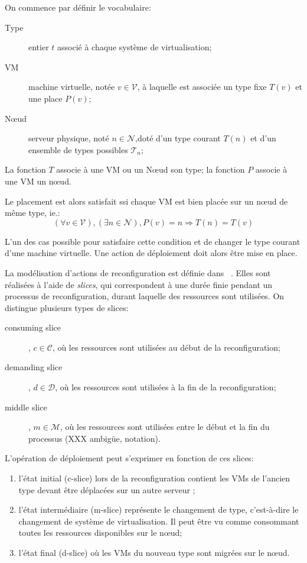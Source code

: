 On commence par définir le vocabulaire:
\begin{description}
	\item[Type] entier $t$ associé à chaque système de virtualisation;
	\item[VM] machine virtuelle, notée $v \in \mathcal V$, à laquelle
		est associée un type fixe $T(v)$ et une place $P(v)$;
	\item[Nœud] serveur physique, noté $n \in \mathcal N$,doté d'un
		type courant $T(n)$ et d'un ensemble de types possibles
		$\mathcal{T}_n$;
\end{description}


La fonction $T$ associe à une VM ou un Nœud son type; la fonction $P$
associe à une VM un nœud.

Le placement est alors satisfait ssi chaque VM est bien placée sur
un nœud de même type, ie.:
\[
	(\forall v \in \mathcal V), (\exists n \in \mathcal N), P(v) = n
		\Rightarrow T(n) = T(v)	
\]

L'un des cas possible pour satisfaire cette condition et de changer le
type courant d'une machine virtuelle. Une action de déploiement doit
alors être mise en place.

La modélisation d'actions de reconfiguration est définie dans ~\cite{herm2012}.
Elles sont réalisées à l'aide de \textit{slices}, qui correspondent à
une durée finie pendant un processus de reconfiguration, durant laquelle
des ressources sont utilisées.
On distingue plusieurs types de slices:
\begin{description}
	\item[consuming slice], $c \in \mathcal C$, où les ressources sont
		utilisées au début de la reconfiguration;
	\item[demanding slice], $d \in \mathcal D$, où les ressources sont
		utilisées à la fin de la reconfiguration;
	\item[middle slice], $m \in \mathcal M$, où les ressources sont utilisées
		entre le début et la fin du processus (XXX ambigüe, notation).
\end{description}

L'opération de déploiement peut s'exprimer en fonction de ces slices:
\begin{enumerate}
	\item l'état initial (c-slice) lors de la reconfiguration contient les
		VMs de l'ancien type devant être déplacées sur un autre serveur ;
	\item l'état intermédiaire (m-slice) représente le changement de type,
		c'est-à-dire le changement de système de virtualisation. Il
		peut être vu comme consommant toutes les ressources disponibles
		sur le nœud;
	\item l'état final (d-slice) où les VMs du nouveau type sont migrées sur
		le nœud.
\end{enumerate}

